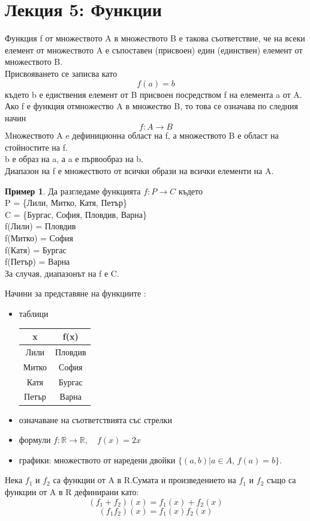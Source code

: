 \documentclass[fleqn, 12pt]{article}
\theoremstyle{definition}
\newtheorem{example}{Пример}[subsection]
\begin{document}
\section{Лекция 5: Функции}
Функция f от множеството A в множеството B е такова съответствие, че на всеки  елемент от множеството A е съпоставен (присвоен) един (единствен) елемент от множеството B.\\
Присвояването се записва като 
$$f(a) = b$$ 
където b е едиствения елемент от B присвоен посредством f на елемента a от A. Ако f е функция отмножество A в множество B, то това се означава по следния начин 
$$f: A \to B$$
Mножеството A  e дефиниционна област на f, а множеството B е област на стойностите на f. \\
b е образ на a, а a е първообраз на b. \\
Диапазон на f е множеството от всички образи на всички  елементи на A.\\
\begin{example}
Да разгледаме функцията $f: P \to C$ където \\
P = \{Лили, Митко, Катя, Петър\} \\
C = \{Бургас, София, Пловдив, Варна\}\\
f(Лили) = Пловдив \\
f(Митко) = София \\
f(Катя) = Бургас \\
f(Петър) = Варна \\
За случая, диапазонът на f е C. 
\end{example}
Начини за представяне на функциите :

\begin{itemize}
\item таблици 
\begin{table}[h!]
  \begin{center}
    \begin{tabular}{|c|c|} 
\hline
      \textbf{x} & \textbf{f(x)}\\
\hline
	Лили & Пловдив  \\ 
\hline
	Митко & София  \\
\hline
	Катя & Бургас \\
\hline
 	Петър & Варна \\  
\hline
    \end{tabular}
  \end{center}
\end{table}
\item означаване на съответствията със стрелки 
\item формули $f:\mathbb{R} \to \mathbb{R}, \quad f(x) = 2x$
\item графики: множеството от наредени двойки $ \{(a, b) | a \in A, \, f(a) = b\}$.
\end{itemize}
Нека $f_1$ и $f_2$ са функции от A в R.Сумата и произведението на $f_1$ и $f_2$ също са функции от A в R дефинирани като:
$$(f_1+ f_2)(x) =  f_1(x) + f_2(x)$$
$$(f_1f_2)(x) =  f_1(x) f_2(x)$$
\end{document}
